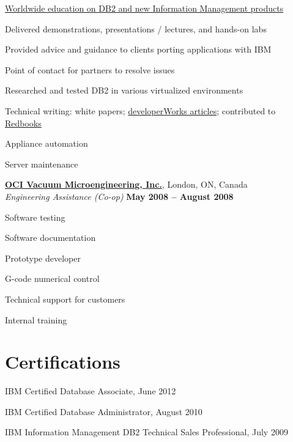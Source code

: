 \documentclass[margin,line]{resume}
\begin{document}
\begin{resume}
\begin{list2}
		\item \href{http://www.ibm.com/developerworks/data/bootcamps}{Worldwide education on DB2 and new Information Management products}
		\item Delivered demonstrations, presentations / lectures, and hands-on labs
		\item Provided advice and guidance to clients porting applications with IBM
		\item Point of contact for partners to resolve issues
		\item Researched and tested DB2 in various virtualized environments
		\item Technical writing: white papers; \href{http://www.ibm.com/developerworks/mydeveloperworks/profiles/user/ppruski}{developerWorks articles}; contributed to \href{http://www.redbooks.ibm.com/abstracts/sg247805.html}{Redbooks}
		\item Appliance automation
		\item Server maintenance
	\end{list2}

	\textbf{\href{http://www.ocivm.com/}{OCI Vacuum Microengineering, Inc.}}, London, ON, Canada	\vspace{2mm}\\\vspace{1mm}
	\textsl{Engineering Assistance (Co-op)}					\hfill\textbf{May 2008 -- August 2008}		\\\vspace{-3mm}
	\begin{list2}
		\item Software testing
		\item Software documentation
		\item Prototype developer
		\item G-code numerical control
		\item Technical support for customers
		\item Internal training
	\end{list2}

\section{\mysidestyle Certifications}

\begin{list2}
	\item IBM Certified Database Associate, June 2012
	\item IBM Certified Database Administrator, August 2010
	\item IBM Information Management DB2 Technical Sales Professional, July 2009
\end{list2}


\end{resume}
\end{document}
